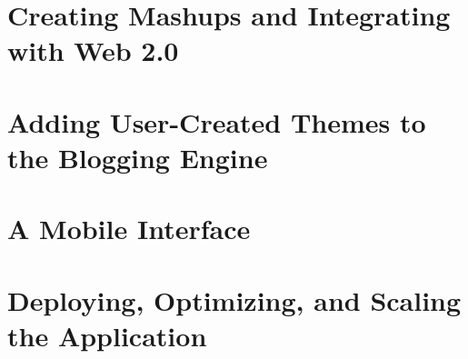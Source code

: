 \documentclass{beamer}
\begin{document}
\section{Creating Mashups and Integrating with Web 2.0}
\section{Adding User-Created Themes to the Blogging Engine}
\section{A Mobile Interface}
\section{Deploying, Optimizing, and Scaling the Application}
\end{document}
